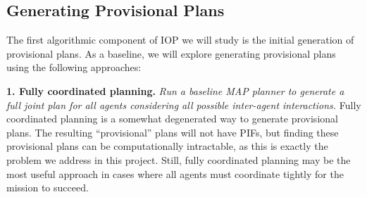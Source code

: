 \documentclass[11pt]{article}
\begin{document}
\subsection{Generating Provisional Plans}
\label{sec:generating}

The first algorithmic component of IOP we will study is the initial generation of provisional plans. As a baseline, we will explore generating provisional plans using the following approaches:

{\bf 1. Fully coordinated planning.} {\em Run a baseline MAP planner to generate a full joint plan for all agents considering all possible inter-agent interactions.} 
Fully coordinated planning is a somewhat degenerated way to generate provisional plans. The resulting ``provisional'' plans will not have PIFs, but finding these provisional plans can be computationally intractable, as this is exactly the problem we address in this project. 
Still, fully coordinated planning may be the most useful approach in cases where all agents must coordinate tightly for the mission to succeed. 
\end{document}
